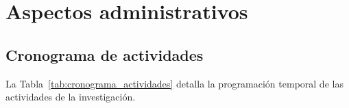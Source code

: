 \newpage

\chapter{Aspectos administrativos}

\section{Cronograma de actividades}

La Tabla~\ref{tab:cronograma_actividades} detalla la programación temporal de las actividades de la investigación.

